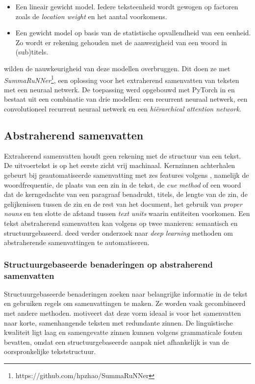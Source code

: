 \begin{itemize}
	\item Een lineair gewicht model. Iedere teksteenheid wordt gewogen op factoren zoals de \textit{location weight} en het aantal voorkomens.
	\item Een gewicht model op basis van de statistische opvallendheid van een eenheid. Zo wordt er rekening gehouden met de aanwezigheid van een woord in (sub)titels.
\end{itemize}


\textcite{Nallapati2017} wilden de nauwkeurigheid van deze modellen overbruggen. Dit doen ze met \textit{SummaRuNNer}\footnote{https://github.com/hpzhao/SummaRuNNer}, een oplossing voor het extraherend samenvatten van teksten met een neuraal netwerk. De toepassing werd opgebouwd met PyTorch in  en bestaat uit een combinatie van drie modellen: een recurrent neuraal netwerk, een convolutioneel recurrent neuraal netwerk en een \textit{hiërarchical attention network}.

\subsection{Abstraherend samenvatten}

Extraherend samenvatten houdt geen rekening met de structuur van een tekst. De uitvoertekst is op het eerste zicht vrij machinaal. Kernzinnen achterhalen gebeurt bij geautomatiseerde samenvatting met zes features volgens \textcite{Khan2014}, namelijk de woordfrequentie, de plaats van een zin in de tekst, de \textit{cue method} of een woord dat de kerngedachte van een paragraaf benadrukt, titels, de lengte van de zin, de gelijkenissen tussen de zin en de rest van het document, het gebruik van \textit{proper nouns} en ten slotte de afstand tussen \textit{text units} waarin entiteiten voorkomen. Een tekst abstraherend samenvatten kan volgens \textcite{Khan2014} op twee manieren: semantisch en structuurgebaseerd. \textcite{Cao2022} deed verder onderzoek naar \textit{deep learning} methoden om abstraherende samenvattingen te automatiseren.

\subsubsection{Structuurgebaseerde benaderingen op abstraherend samenvatten}

Structuurgebaseerde benaderingen zoeken naar belangrijke informatie in de tekst en gebruiken regels om samenvattingen te maken. Ze worden vaak gecombineerd met andere methoden. \textcite{Khan2014} motiveert dat deze vorm ideaal is voor het samenvatten naar korte, samenhangende teksten met redundante zinnen. De linguïstische kwaliteit ligt laag en samengevatte zinnen kunnen volgens \textcite{Khan2014} grammaticale fouten bevatten, omdat een structuurgebaseerde aanpak niet afhankelijk is van de oorspronkelijke tekststructuur.

